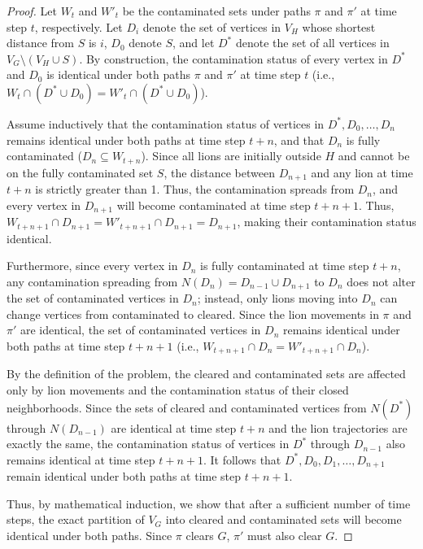 \documentclass[a4paper,UKenglish,cleveref, autoref, thm-restate]{lipics-v2021}
\begin{document}
\begin{proof}
Let $W_t$ and $W'_t$ be the contaminated sets under paths $\pi$ and $\pi'$ at time step $t$, respectively. Let $D_i$ denote the set of vertices in $V_H$ whose shortest distance from $S$ is $i$, $D_0$ denote $S$, and let $D^*$ denote the set of all vertices in $V_G \setminus (V_H \cup S)$. By construction, the contamination status of every vertex in $D^*$ and $D_0$ is identical under both paths $\pi$ and $\pi'$ at time step $t$ (i.e., $W_t \cap (D^* \cup D_0) = W'_t \cap (D^* \cup D_0)$).

Assume inductively that the contamination status of vertices in $D^*, D_0, \dots, D_n$ remains identical under both paths at time step $t+n$, and that $D_n$ is fully contaminated ($D_n \subseteq W_{t+n}$). Since all lions are initially outside $H$ and cannot be on the fully contaminated set $S$, the distance between $D_{n+1}$ and any lion at time $t+n$ is strictly greater than 1. Thus, the contamination spreads from $D_n$, and every vertex in $D_{n+1}$ will become contaminated at time step $t+n+1$. Thus, $W_{t+n+1} \cap D_{n+1} = W'_{t+n+1} \cap D_{n+1} = D_{n+1}$, making their contamination status identical.

Furthermore, since every vertex in $D_n$ is fully contaminated at time step $t+n$, any contamination spreading from $N(D_n)=D_{n-1}\cup D_{n+1}$ to $D_n$ does not alter the set of contaminated vertices in $D_n$; instead, only lions moving into $D_n$ can change vertices from contaminated to cleared. Since the lion movements in $\pi$ and $\pi'$ are identical, the set of contaminated vertices in $D_n$ remains identical under both paths at time step $t+n+1$ (i.e., $W_{t+n+1} \cap D_n = W'_{t+n+1} \cap D_n$).

By the definition of the problem, the cleared and contaminated sets are affected only by lion movements and the contamination status of their closed neighborhoods. Since the sets of cleared and contaminated vertices from $N(D^*)$ through $N(D_{n-1})$ are identical at time step $t+n$ and the lion trajectories are exactly the same, the contamination status of vertices in $D^*$ through $D_{n-1}$ also remains identical at time step $t+n+1$. It follows that $D^*, D_0, D_1, \dots , D_{n+1}$ remain identical under both paths at time step $t+n+1$.

Thus, by mathematical induction, we show that after a sufficient number of time steps, the exact partition of $V_G$ into cleared and contaminated sets will become identical under both paths. Since $\pi$ clears $G$, $\pi'$ must also clear $G$.
\end{proof}
\end{document}
